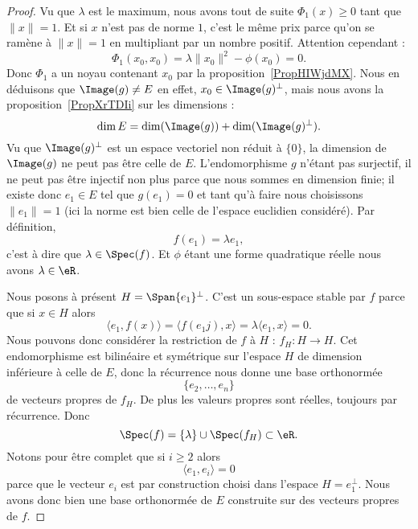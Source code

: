 \begin{proof}
    Vu que \( \lambda\) est le maximum, nous avons tout de suite \( \Phi_1(x)\geq 0\) tant que \( \| x \|=1\). Et si \( x\) n'est pas de norme \( 1\), c'est le même prix parce qu'on se ramène à \( \| x \|=1\) en multipliant par un nombre positif. Attention cependant :
    \begin{equation}
        \Phi_1(x_0,x_0)=\lambda\| x_0 \|^2-\phi(x_0)=0.
    \end{equation}
    Donc \( \Phi_1\) a un noyau contenant \( x_0\) par la proposition~\ref{PropHIWjdMX}. Nous en déduisons que \( \Image(g)\neq E\) en effet, \( x_0\in\Image(g)^{\perp}\), mais nous avons la proposition~\ref{PropXrTDIi} sur les dimensions :
    \begin{equation}
        \dim E=\dim(\Image(g))+\dim( \Image(g)^{\perp}).
    \end{equation}
    Vu que \( \Image(g)^{\perp}\) est un espace vectoriel non réduit à \( \{ 0 \}\), la dimension de \( \Image(g)\) ne peut pas être celle de \( E\). L'endomorphisme \( g\) n'étant pas surjectif, il ne peut pas être injectif non plus parce que nous sommes en dimension finie; il existe donc \( e_1\in E\) tel que \( g(e_1)=0\) et tant qu'à faire nous choisissons \( \| e_1 \|=1\) (ici la norme est bien celle de l'espace euclidien considéré). Par définition,
    \begin{equation}
        f(e_1)=\lambda e_1,
    \end{equation}
    c'est à dire que \( \lambda\in\Spec(f)\). Et \( \phi\) étant une forme quadratique réelle nous avons \( \lambda\in \eR\).

    Nous posons à présent \( H=\Span\{ e_1 \}^{\perp}\). C'est un sous-espace stable par \( f\) parce que si \( x\in H\) alors
    \begin{equation}
        \langle e_1, f(x)\rangle =\langle f(e_1j),x\rangle =\lambda\langle e_1, x\rangle =0.
    \end{equation}
    Nous pouvons donc considérer la restriction de \( f\) à \( H\) : \( f_H\colon H\to H\). Cet endomorphisme est bilinéaire et symétrique sur l'espace \( H\) de dimension inférieure à celle de \( E\), donc la récurrence nous donne une base orthonormée
    \begin{equation}
        \{ e_2,\ldots, e_n \}
    \end{equation}
    de vecteurs propres de \( f_H\). De plus les valeurs propres sont réelles, toujours par récurrence. Donc
    \begin{equation}
        \Spec(f)=\{ \lambda \}\cup\Spec(f_H)\subset \eR.
    \end{equation}
    Notons pour être complet que si \( i\geq 2\) alors
    \begin{equation}
        \langle e_1, e_i\rangle =0
    \end{equation}
    parce que le vecteur \( e_i\) est par construction choisi dans l'espace \( H=e_1^{\perp}\). Nous avons donc bien une base orthonormée de \( E\) construite sur des vecteurs propres de \( f\).
\end{proof}

